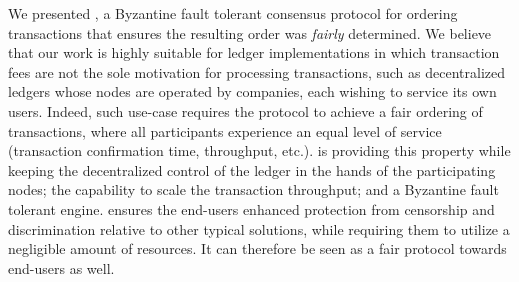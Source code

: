 We presented \nameNS, a Byzantine fault tolerant consensus protocol for ordering transactions that ensures the resulting order was \emph{fairly} determined. We believe that our work is highly suitable for ledger implementations in which transaction fees are not the sole motivation for processing transactions, such as decentralized ledgers whose nodes are operated by companies, each wishing to service its own users. Indeed, such use-case requires the protocol to achieve a fair ordering of transactions, where all participants experience an equal level of service (transaction confirmation time, throughput, etc.). \name is providing this property while keeping the decentralized control of the ledger in the hands of the participating nodes; the capability to scale the transaction throughput; and a Byzantine fault tolerant engine. \name ensures the end-users enhanced protection from censorship and discrimination relative to other typical solutions, while requiring them to utilize a negligible amount of resources. It can therefore be seen as a fair protocol towards end-users as well.


